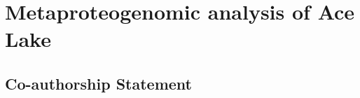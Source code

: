 \chapter{Metaproteogenomic analysis of Ace Lake}
\section*{Co-authorship Statement}

\label{ch:ace}
